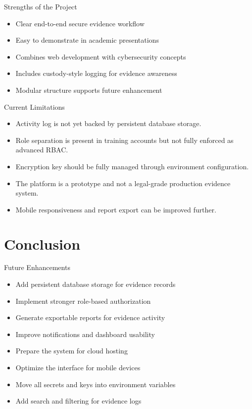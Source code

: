 \documentclass[aspectratio=169]{beamer}
\begin{document}
\begin{frame}{Strengths of the Project}
    \begin{itemize}
        \item Clear end-to-end secure evidence workflow
        \item Easy to demonstrate in academic presentations
        \item Combines web development with cybersecurity concepts
        \item Includes custody-style logging for evidence awareness
        \item Modular structure supports future enhancement
    \end{itemize}
\end{frame}

\begin{frame}{Current Limitations}
    \begin{itemize}
        \item Activity log is not yet backed by persistent database storage.
        \item Role separation is present in training accounts but not fully enforced as advanced RBAC.
        \item Encryption key should be fully managed through environment configuration.
        \item The platform is a prototype and not a legal-grade production evidence system.
        \item Mobile responsiveness and report export can be improved further.
    \end{itemize}
\end{frame}

\section{Conclusion}

\begin{frame}{Future Enhancements}
    \begin{itemize}
        \item Add persistent database storage for evidence records
        \item Implement stronger role-based authorization
        \item Generate exportable reports for evidence activity
        \item Improve notifications and dashboard usability
        \item Prepare the system for cloud hosting
        \item Optimize the interface for mobile devices
        \item Move all secrets and keys into environment variables
        \item Add search and filtering for evidence logs
    \end{itemize}
\end{frame}
\end{document}
